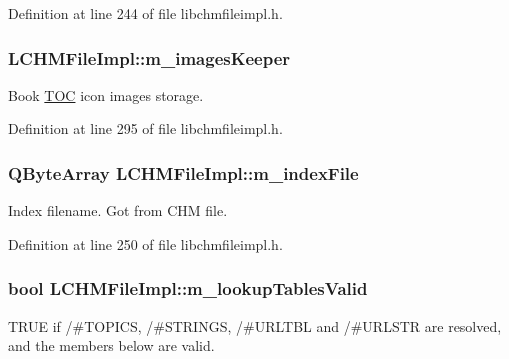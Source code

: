 Definition at line 244 of file libchmfileimpl.\+h.

\hypertarget{classLCHMFileImpl_afbd4fcdb78858fab9c7c594c58cd4367}{
\subsubsection[{m\+\_\+images\+Keeper}]{ L\+C\+H\+M\+File\+Impl\+::m\+\_\+images\+Keeper}}\label{classLCHMFileImpl_afbd4fcdb78858fab9c7c594c58cd4367}


Book \hyperlink{classTOC}{T\+O\+C} icon images storage. 



Definition at line 295 of file libchmfileimpl.\+h.

\hypertarget{classLCHMFileImpl_ab5f59c7a474b444bb07a1992bd0a6d82}{
\subsubsection[{m\+\_\+index\+File}]{\setlength{\rightskip}{0pt plus 5cm}Q\+Byte\+Array L\+C\+H\+M\+File\+Impl\+::m\+\_\+index\+File}}\label{classLCHMFileImpl_ab5f59c7a474b444bb07a1992bd0a6d82}


Index filename. Got from C\+H\+M file. 



Definition at line 250 of file libchmfileimpl.\+h.

\hypertarget{classLCHMFileImpl_a1bd04b8772eaa2e3dd91bda8c4553f90}{
\subsubsection[{m\+\_\+lookup\+Tables\+Valid}]{\setlength{\rightskip}{0pt plus 5cm}bool L\+C\+H\+M\+File\+Impl\+::m\+\_\+lookup\+Tables\+Valid}}\label{classLCHMFileImpl_a1bd04b8772eaa2e3dd91bda8c4553f90}


T\+R\+U\+E if /\#\+T\+O\+P\+I\+C\+S, /\#\+S\+T\+R\+I\+N\+G\+S, /\#\+U\+R\+L\+T\+B\+L and /\#\+U\+R\+L\+S\+T\+R are resolved, and the members below are valid. 



